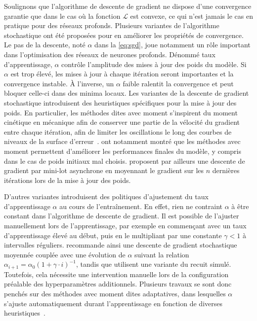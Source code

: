 Soulignons que l'algorithme de descente de gradient ne dispose d'une convergence garantie que dans le cas où la fonction $\mathcal{L}$ est convexe, ce qui n'est jamais le cas en pratique pour des réseaux profonds. Plusieurs variantes de l'algorithme stochastique ont été proposées pour en améliorer les propriétés de convergence. Le pas de la descente, noté $\alpha$ dans la \cref{eq:sgd}, joue notamment un rôle important dans l'optimisation des réseaux de neurones profonds. Dénommé taux d'apprentissage, $\alpha$ contrôle l'amplitude des mises à jour des poids du modèle. Si $\alpha$ est trop élevé, les mises à jour à chaque itération seront importantes et la convergence instable. À l'inverse, un $\alpha$ faible ralentit la convergence et peut bloquer celle-ci dans des minima locaux. Les variantes de la descente de gradient stochastique introduisent des heuristiques spécifiques pour la mise à jour des poids. En particulier, les méthodes dites avec \og moment \fg s'inspirent du moment cinétique en mécanique afin de conserver une partie de la vélocité du gradient entre chaque itération, afin de limiter les oscillations le long des courbes de niveaux de la surface d'erreur~\cite{qian_momentum_1999,nesterov_method_1983}. \citet{sutskever_importance_2013} ont notamment montré que les méthodes avec moment permettent d'améliorer les performances finales du modèle, y compris dans le cas de poids initiaux mal choisis. \citet{polyak_acceleration_1992} proposent par ailleurs une descente de gradient par mini-lot asynchrone en moyennant le gradient sur les $n$ dernières itérations lors de la mise à jour des poids.

D'autres variantes introduisent des politiques d'ajustement du taux d'apprentissage $\alpha$ au cours de l'entraînement. En effet, rien ne contraint $\alpha$ à être constant dans l'algorithme de descente de gradient. Il est possible de l'ajuster manuellement lors de l'apprentissage, par exemple en commençant avec un taux d'apprentissage élevé au début, puis en le multipliant par une constante $\gamma < 1$ à intervalles réguliers. \citet{bottou_stochastic_2012} recommande ainsi une descente de gradient stochastique moyennée couplée avec une évolution de $\alpha$ suivant la relation $\alpha_{i+1} = \alpha_0 (1 + \gamma \cdot i)^{-1}$, tandis que \citet{loshchilov_sgdr_2017} utilisent une variante du recuit simulé. Toutefois, cela nécessite une intervention manuelle lors de la configuration préalable des hyperparamètres additionnels. Plusieurs travaux se sont donc penchés sur des méthodes avec moment dites adaptatives, dans lesquelles $\alpha$ s'ajuste automatiquement durant l'apprentissage en fonction de diverses heuristiques~\cite{duchi_adaptive_2011,tielman_lecture_2012,zeiler_adadelta_2012,kingma_adam_2014}.

